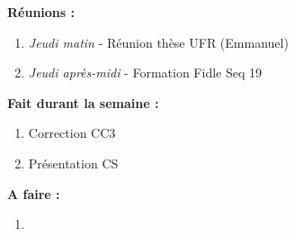\textbf{Réunions :}
\begin{enumerate}[label=\textbullet]
	\item \textit{Jeudi matin} - Réunion thèse UFR (Emmanuel)
	\item \textit{Jeudi après-midi} - Formation Fidle Seq 19
\end{enumerate}
\textbf{Fait durant la semaine :}
\begin{enumerate}[label=\textbullet]
	\item Correction CC3
	\item Présentation CS
\end{enumerate}
\textbf{A faire :}
\begin{enumerate}[label=\textbullet]
	\item
\end{enumerate}
